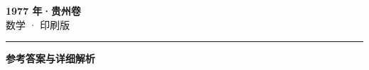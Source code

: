 \documentclass[zihao=5, a4paper]{ctexart}
\begin{document}
\begin{center}
  {\Large\bfseries 1977 年·贵州卷}\\[4pt]
  {\large 数学 · 印刷版}
\end{center}
\medskip
{}

\par\bigskip\hrule\bigskip
{}
\begin{center}{\large\bfseries 参考答案与详细解析}\end{center}
\smallskip

\end{document}
